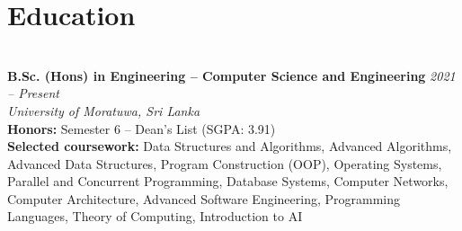 
\section*{Education}
\BigDivider\\
\noindent
\textbf{B.Sc. (Hons) in Engineering – Computer Science and Engineering}
\hfill \textit{2021 -- Present}\\
\textit{University of Moratuwa, Sri Lanka}\\[0.25em]
\small
\textbf{Honors:} Semester 6 -- Dean's List (SGPA: 3.91)\\[0.25em]
\textbf{Selected coursework:}
Data Structures and Algorithms, Advanced Algorithms, Advanced Data Structures, Program Construction (OOP),
Operating Systems, Parallel and Concurrent Programming, Database Systems,
Computer Networks, Computer Architecture, Advanced Software Engineering,
Programming Languages, Theory of Computing, Introduction to AI
\normalsize



